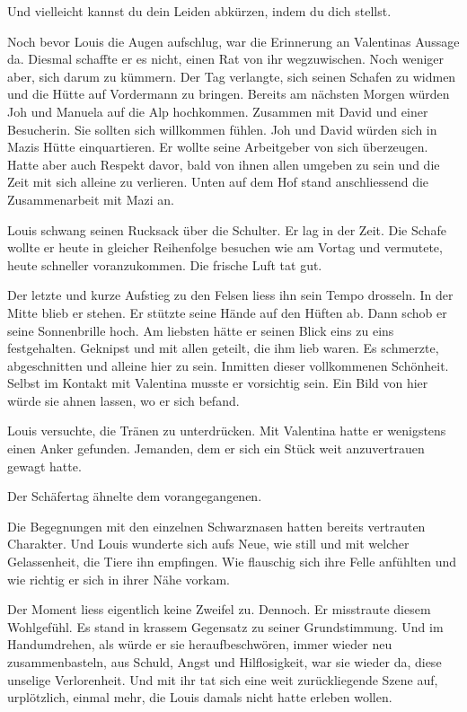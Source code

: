 Und vielleicht kannst du dein Leiden abkürzen, indem du dich stellst.

Noch bevor Louis die Augen aufschlug, war die Erinnerung an Valentinas
Aussage da. Diesmal schaffte er es nicht, einen Rat von ihr
wegzuwischen. Noch weniger aber, sich darum zu kümmern. Der Tag
verlangte, sich seinen Schafen zu widmen und die Hütte auf Vordermann zu
bringen. Bereits am nächsten Morgen würden Joh und Manuela auf die Alp
hochkommen. Zusammen mit David und einer Besucherin. Sie sollten sich
willkommen fühlen. Joh und David würden sich in Mazis Hütte
einquartieren. Er wollte seine Arbeitgeber von sich überzeugen. Hatte
aber auch Respekt davor, bald von ihnen allen umgeben zu sein und die
Zeit mit sich alleine zu verlieren. Unten auf dem Hof stand
anschliessend die Zusammenarbeit mit Mazi an.

Louis schwang seinen Rucksack über die Schulter. Er lag in der Zeit. Die
Schafe wollte er heute in gleicher Reihenfolge besuchen wie am Vortag
und vermutete, heute schneller voranzukommen. Die frische Luft tat gut.

Der letzte und kurze Aufstieg zu den Felsen liess ihn sein Tempo
drosseln. In der Mitte blieb er stehen. Er stützte seine Hände auf den
Hüften ab. Dann schob er seine Sonnenbrille hoch. Am liebsten hätte er
seinen Blick eins zu eins festgehalten. Geknipst und mit allen geteilt,
die ihm lieb waren. Es schmerzte, abgeschnitten und alleine hier zu
sein. Inmitten dieser vollkommenen Schönheit. Selbst im Kontakt mit
Valentina musste er vorsichtig sein. Ein Bild von hier würde sie ahnen
lassen, wo er sich befand.

Louis versuchte, die Tränen zu unterdrücken. Mit Valentina hatte er
wenigstens einen Anker gefunden. Jemanden, dem er sich ein Stück weit
anzuvertrauen gewagt hatte.

Der Schäfertag ähnelte dem vorangegangenen.

Die Begegnungen mit den einzelnen Schwarznasen hatten bereits vertrauten
Charakter. Und Louis wunderte sich aufs Neue, wie still und mit welcher
Gelassenheit, die Tiere ihn empfingen. Wie flauschig sich ihre Felle
anfühlten und wie richtig er sich in ihrer Nähe vorkam.

Der Moment liess eigentlich keine Zweifel zu. Dennoch. Er misstraute
diesem Wohlgefühl. Es stand in krassem Gegensatz zu seiner
Grundstimmung. Und im Handumdrehen, als würde er sie heraufbeschwören,
immer wieder neu zusammenbasteln, aus Schuld, Angst und Hilflosigkeit,
war sie wieder da, diese unselige Verlorenheit. Und mit ihr tat sich
eine weit zurückliegende Szene auf, urplötzlich, einmal mehr, die Louis
damals nicht hatte erleben wollen.


